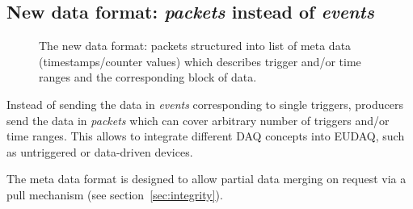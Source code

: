 \documentclass[paper=a4, fontsize=11pt]{scrartcl}	%
\numberwithin{equation}{section}		%
\numberwithin{figure}{section}			%
\numberwithin{table}{section}           	%
\begin{document}
\subsection{New data format: \emph{packets} instead of \emph{events}}
\label{sec:event}

\begin{figure}[htbp]
  \centering
  
  \caption{The new data format: packets structured into list of meta
    data (timestamps/counter values) which describes trigger and/or
    time ranges and the corresponding block of data.}
\label{fig:packetformat}
\end{figure}

Instead of sending the data in \emph{events} corresponding to single
triggers, producers send the data in \emph{packets} which can cover
arbitrary number of triggers and/or time ranges. This allows to
integrate different DAQ concepts into EUDAQ, such as untriggered or
data-driven devices.

The meta data format is designed to allow partial data merging on
request via a pull mechanism (see section~\ref{sec:integrity}).
\end{document}
